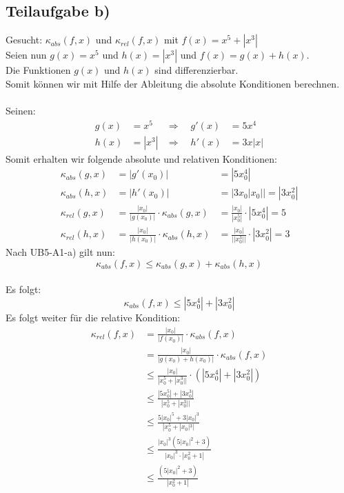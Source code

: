 \documentclass{llncs}
\begin{document}
\subsection*{Teilaufgabe b)}
Gesucht: $\kappa_{abs}(f,x)$ und $\kappa_{rel}(f,x)$ mit $f(x)= x^5 + |x^3|$\\
Seien nun $g(x)=x^5$ und $h(x)=|x^3|$ und $f(x)=g(x)+h(x)$.\\
Die Funktionen $g(x)$ und $h(x)$ sind differenzierbar.\\
Somit können wir mit Hilfe der Ableitung die absolute Konditionen berechnen.\\
\\
Seinen:
\begin{align*}
g(x)&=x^5  &\Rightarrow \quad g'(x)&= 5x^4\\
h(x)&=|x^3|  &\Rightarrow \quad h'(x)&= 3x|x| 
\end{align*}
Somit erhalten wir folgende absolute und relativen Konditionen:\\
\begin{align*}
\kappa_{abs}(g,x) &=|g'(x_0)| &= |5x_0^4| \\
\kappa_{abs}(h,x) &=|h'(x_0)| &= |3x_0|x_0|| = |3x_0^2| \\
\kappa_{rel}(g,x) &= \frac{|x_0|}{|g(x_0)|}\cdot\kappa_{abs}(g,x)  &= \frac{|x_0|}{|x_0^5|}\cdot|5x_0^4| = 5\\
\kappa_{rel}(h,x) &=\frac{|x_0|}{|h(x_0)|}\cdot\kappa_{abs}(h,x)  &= \frac{|x_0|}{||x_0^3||}\cdot|3x_0^2| = 3
\end{align*}
Nach UB5-A1-a) gilt nun:\\
$$\kappa_{abs}(f,x)\le \kappa_{abs}(g,x) + \kappa_{abs}(h,x)$$\\
Es folgt:\\
$$\kappa_{abs}(f,x)\le |5x_0^4| + |3x_0^2|$$
Es folgt weiter für die relative Kondition:
\begin{align*}
\kappa_{rel}(f,x) &= \frac{|x_0|}{|f(x_0)|}\cdot\kappa_{abs}(f,x)\\ 
&= \frac{|x_0|}{|g(x_0)+h(x_0)|}\cdot\kappa_{abs}(f,x)\\
&\le  \frac{|x_0|}{|x_0^5+|x_0^3||}\cdot (|5x_0^4| + |3x_0^2|)\\
&\le  \frac{|5x_0^5| + |3x_0^3|}{|x_0^5+|x_0^3||}\\
&\le  \frac{5|x_0|^5 + 3|x_0|^3}{|x_0^5+|x_0|^3|}\\
&\le  \frac{|x_0|^3(5|x_0|^2 + 3)}{|x_0|^3\cdot|x_0^2+1|}\\
&\le  \frac{(5|x_0|^2 + 3)}{|x_0^2+1|}\\
\end{align*}  
\end{document}
